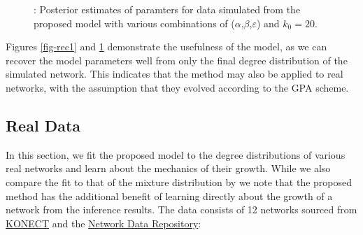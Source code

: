 \documentclass[
  sn-basic,
]{sn-jnl}
\theoremstyle{plain}
\theoremstyle{plain}
\theoremstyle{remark}
\begin{document}
\begin{figure}


\caption{\label{fig-rec2}: Posterior estimates of paramters for data
simulated from the proposed model with various combinations of
(\(\alpha\),\(\beta\),\(\varepsilon\)) and \(k_0=20\).}

\end{figure}%

Figures \ref{fig-rec1} and \ref{fig-rec2} demonstrate the usefulness of
the model, as we can recover the model parameters well from only the
final degree distribution of the simulated network. This indicates that
the method may also be applied to real networks, with the assumption
that they evolved according to the GPA scheme.

\subsection{Real Data}\label{sec-real}

In this section, we fit the proposed model to the degree distributions
of various real networks and learn about the mechanics of their growth.
While we also compare the fit to that of the mixture distribution by
\citet{Lee24} we note that the proposed method has the additional
benefit of learning directly about the growth of a network from the
inference results. The data consists of 12 networks sourced from
\href{konect.cc}{KONECT} and the
\href{https://networkrepository.com}{Network Data Repository}\citep{nr}:
\end{document}
